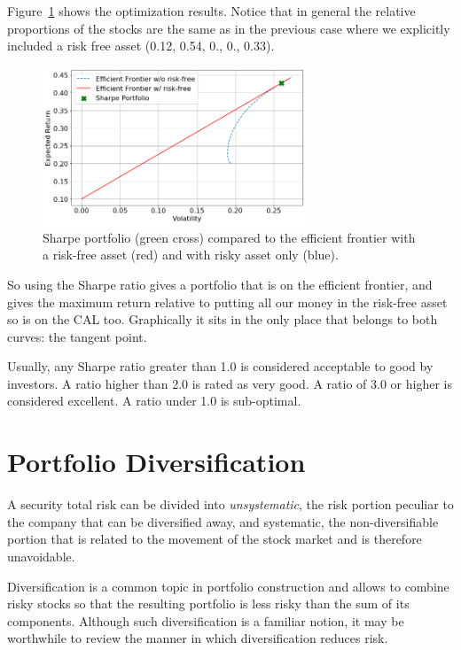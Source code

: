 Figure~\ref{fig:sharpe_ratio} shows the optimization results. Notice that in general the relative proportions of the stocks are the same as in the previous case where we explicitly included a risk free asset (0.12, 0.54, 0., 0., 0.33).

\begin{figure}[htb]
	\centering
	\includegraphics[width=0.7\textwidth]{figures/sharpe_ratio}
	\caption{Sharpe portfolio (green cross) compared to the efficient frontier with a risk-free asset (red) and with risky asset only (blue).}
	\label{fig:sharpe_ratio}
\end{figure}

So using the Sharpe ratio gives a portfolio that is on the efficient frontier, and gives the maximum return relative to putting all our money in the risk-free asset so is on the CAL too. Graphically it sits in the only place that belongs to both curves: the tangent point.

Usually, any Sharpe ratio greater than 1.0 is considered acceptable to good by investors. A ratio higher than 2.0 is rated as very good. A ratio of 3.0 or higher is considered excellent. A ratio under 1.0 is sub-optimal.

\section{Portfolio Diversification}

A security total risk can be divided into \emph{unsystematic}, the risk portion peculiar to the company that can be diversified away, and systematic, the non-diversifiable portion that is related to the movement of the stock market and is therefore unavoidable. 

Diversification is a common topic in portfolio construction and allows to combine risky stocks so that the resulting portfolio is less risky than the sum of its components. Although such diversification is a familiar notion, it may be worthwhile to review the manner in which diversification reduces risk.

